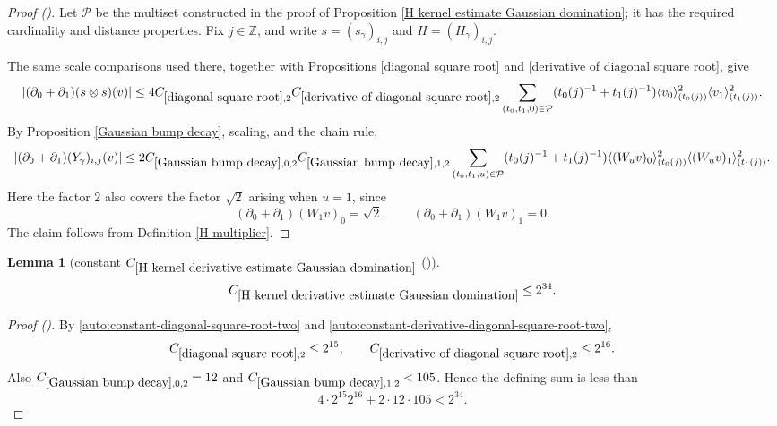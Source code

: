 \documentclass[12pt,reqno]{amsart}
\newcommand{\auto}{{({\tiny\faCar})}}
\theoremstyle{plain}
\newtheorem{lemma}[theorem]{Lemma}
\numberwithin{equation}{section}
\theoremstyle{remark}
\newcommand{\using}[1]{}
\newcommand{\Z}{{\mathbb Z}}
\begin{document}
\begin{proof}[Proof \auto]
Let $\mathcal P$ be the multiset constructed in the proof of
Proposition \ref{H kernel estimate Gaussian domination}; it has the
required cardinality and distance properties. Fix $j\in\Z$, and write
$s=(s_\gamma)_{i,j}$ and $H=(H_\gamma)_{i,j}$.

The same scale comparisons used there, together with Propositions
\ref{diagonal square root} and
\ref{derivative of diagonal square root}, give
\[
|(\partial_0+\partial_1)(s\otimes s)(v)|
\le
4C_{\ref{diagonal square root},2}
C_{\ref{derivative of diagonal square root},2}
\sum_{(t_0,t_1,0)\in\mathcal P}
(t_0(j)^{-1}+t_1(j)^{-1})
\langle v_0\rangle_{(t_0(j))}^2
\langle v_1\rangle_{(t_1(j))}^2.
\]
By Proposition \ref{Gaussian bump decay}, scaling, and the chain rule,
\[
|(\partial_0+\partial_1)(Y_\gamma)_{i,j}(v)|
\le
2C_{\ref{Gaussian bump decay},0,2}
C_{\ref{Gaussian bump decay},1,2}
\sum_{(t_0,t_1,u)\in\mathcal P}
(t_0(j)^{-1}+t_1(j)^{-1})
\langle (W_uv)_0\rangle_{(t_0(j))}^2
\langle (W_uv)_1\rangle_{(t_1(j))}^2.
\]
Here the factor $2$ also covers the factor $\sqrt2$ arising when
$u=1$, since
\[
(\partial_0+\partial_1)(W_1v)_0=\sqrt2,
\qquad
(\partial_0+\partial_1)(W_1v)_1=0.
\]
The claim follows from Definition \ref{H multiplier}.
\end{proof}

\begin{lemma}[constant $C_{\ref{H kernel derivative estimate Gaussian domination}}$ \auto]\label{constant H kernel derivative estimate Gaussian domination}\using{constant diagonal square root}\using{constant derivative diagonal square root}\using{diagonal square root}\using{derivative of diagonal square root}\using{Gaussian bump decay}
\begin{equation}\label{constant H kernel derivative estimate Gaussian domination bound}
C_{\ref{H kernel derivative estimate Gaussian domination}}\le2^{34}.
\end{equation}
\end{lemma}
\begin{proof}[Proof \auto]
By \eqref{auto:constant-diagonal-square-root-two} and \eqref{auto:constant-derivative-diagonal-square-root-two},
\[
C_{\ref{diagonal square root},2}\le2^{15},
\qquad
C_{\ref{derivative of diagonal square root},2}\le2^{16}.
\]
Also $C_{\ref{Gaussian bump decay},0,2}=12$ and
$C_{\ref{Gaussian bump decay},1,2}<105$. Hence the defining sum is less than
\[
4\cdot2^{15}2^{16}+2\cdot12\cdot105<2^{34}.
\]
\end{proof}
\end{document}
